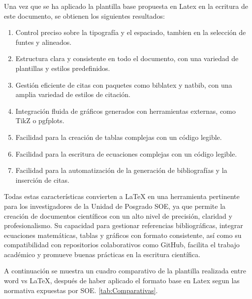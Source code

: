 \documentclass[12pt,twocolumn]{article}
\begin{document}
Una vez que se ha aplicado la plantilla base propuesta en Latex en la ecritura de este documento, se obtienen los siguientes resultados:
    \begin{enumerate}
        \item Control preciso sobre la tipografía y el espaciado, tambien en la selección de funtes y alineados.
        \item Estructura clara y consistente en todo el documento, con una variedad de plantillas y estilos predefinidos.
        \item Gestión eficiente de citas con paquetes como biblatex y natbib, con una amplia variedad de estilos de citación.
        \item Integración fluida de gráficos generados con herramientas externas, como TikZ o pgfplots.
        \item Facilidad para la creación de tablas complejas con un código legible.
        \item Facilidad para la escritura de ecuaciones complejas con un código legible.
        \item Facilidad para la automatización de la generación de bibliografías y la inserción de citas.
    \end{enumerate}
    Todas estas características convierten a LaTeX en una herramienta pertinente para los investigadores de la Unidad de Posgrado SOE, ya que permite la creación de documentos científicos con un alto nivel de precisión, claridad y profesionalismo. 
    Su capacidad para gestionar referencias bibliográficas, integrar ecuaciones matemáticas, tablas y gráficos con formato consistente, así como su compatibilidad con repositorios colaborativos como GitHub, facilita el trabajo académico y promueve buenas prácticas en la escritura científica.

    A continuación se muestra un cuadro comparativo de la plantilla realizada entre word vs LaTeX, después de haber aplicado el formato base en Latex segun las normativa expuestas por SOE.  \ref{tab:Comparativas}.
\end{document}
